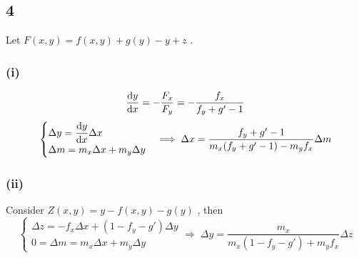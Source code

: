 \documentclass[UTF8]{ctexart}
\begin{document}
\subsection*{4}
Let $F(x, y) = f(x, y) + g(y) - y + z$ .
\subsubsection*{(i)}
\begin{align*}
    \frac{\dif y}{\dif x} = -\frac{F_x}{F_y}
    = - \frac{f_x}{f_y + g' - 1}
\end{align*}
\[
    \begin{cases}
        \Delta y = \dfrac{\dif y}{\dif x} \Delta x \\
        \Delta m = m_x \Delta x + m_y \Delta y
    \end{cases}
    \Longrightarrow\;
    \Delta x = \frac{f_y + g' - 1}{m_x (f_y + g' - 1) - m_y f_x} \Delta m
\]
\subsubsection*{(ii)}
Consider $Z(x, y) = y - f(x, y) - g(y)$ , then
\[
    \begin{cases}
        \Delta z = - f_x \Delta x + (1 - f_y - g')\Delta y \\
        0 = \Delta m = m_x \Delta x + m_y \Delta y
    \end{cases}
    \Longrightarrow\;
    \Delta y = \frac{m_x}{m_x (1 - f_y - g') + m_y f_x} \Delta z
\]
\end{document}

